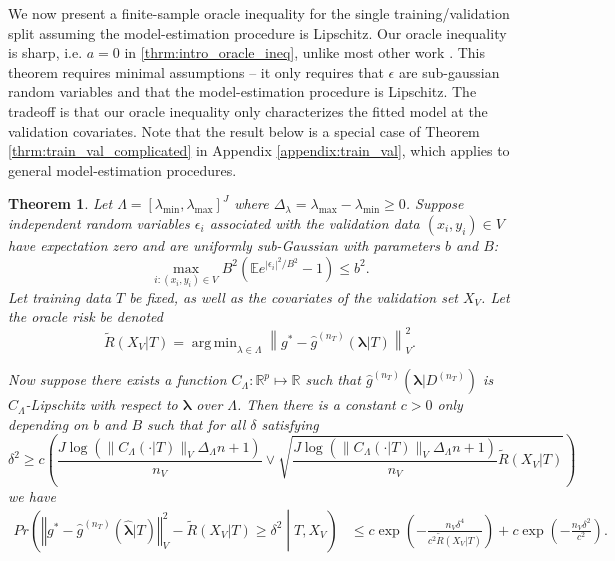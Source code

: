 \documentclass[12pt]{article} %
\newtheorem{theorem}{Theorem}
\theoremstyle{definition}
\DeclareMathOperator*{\argmin}{arg\,min}
\begin{document}
We now present a finite-sample oracle inequality for the single training/validation split assuming the model-estimation procedure is Lipschitz.
Our oracle inequality is sharp, i.e. $a=0$ in \eqref{thrm:intro_oracle_ineq}, unlike most other work \citep{gyorfi2006distribution, lecue2012oracle, van2003unified}.
This theorem requires minimal assumptions -- it only requires that $\epsilon$ are sub-gaussian random variables and that the model-estimation procedure is Lipschitz.
The tradeoff is that our oracle inequality only characterizes the fitted model at the validation covariates.
Note that the result below is a special case of Theorem \ref{thrm:train_val_complicated} in Appendix \ref{appendix:train_val}, which applies to general model-estimation procedures.
\begin{theorem}
	\label{thrm:train_val}
	Let $\Lambda=[\lambda_{\min},\lambda_{\max}]^{J}$ where $\Delta_{\lambda} = \lambda_{\max} - \lambda_{\min} \ge 0$.
	Suppose independent random variables $\epsilon_i$ associated with the validation data $(x_i, y_i) \in V$ have expectation zero and are uniformly sub-Gaussian with parameters $b$ and $B$:
	$$
	\max_{i: (x_i, y_i) \in V} B^2 \left ( \mathbb{E} e^{|\epsilon_i|^2/B^2} - 1 \right ) \le b^2.
	$$
	Let training data $T$ be fixed, as well as the covariates of the validation set $X_V$.
	Let the oracle risk be denoted
	\begin{equation}
	\tilde{R}(X_V|T) = \argmin_{\lambda \in \Lambda} \left \| g^*-\hat{g}^{(n_T)}( \boldsymbol{\lambda} | T) \right \|_{V}^{2}.
	\label{eq:tilde_lambda_def}
	\end{equation}
	
	Now suppose there exists a function $C_\Lambda: \mathbb{R}^p \mapsto \mathbb{R}$ such that $\hat g^{(n_T)}(\boldsymbol{\lambda} |D^{(n_T)})$ is $C_\Lambda$-Lipschitz with respect to $\boldsymbol{\lambda}$ over $\Lambda$.
	Then there is a constant $c>0$ only depending on $b$ and $B$ such that for all $\delta$ satisfying
	\begin{equation}
	\delta^{2}
	\ge
	c \left (
	\frac{J \log(\|C_\Lambda(\cdot |T)\|_V \Delta_{\Lambda} n + 1)}{n_{V}}
	\vee 
	\sqrt{\frac{J \log(\|C_\Lambda(\cdot |T)\|_V \Delta_{\Lambda} n + 1)}{n_{V}}
		\tilde{R}(X_V|T)}
	\right )
	\label{thrm:train_val_delta}
	\end{equation}
	we have
	\begin{align}
	Pr\left(
	\left\Vert g^* - \hat{g}^{(n_T)}( \hat{\boldsymbol{\lambda}} | T) \right\Vert _{V}^2 -
	\tilde{R}(X_V|T)
	\ge\delta^2
	\middle | 
	T, X_V
	\right )
	&\le c\exp\left(-\frac{n_{V}\delta^{4}}{c^{2} \tilde{R}(X_V|T)}\right)
	+ c\exp\left(-\frac{n_{V}\delta^{2}}{c^{2}}\right).
	\end{align}
	
\end{theorem}
\end{document}
